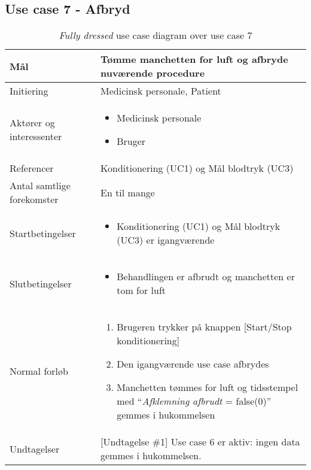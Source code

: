 	\subsection{Use case 7 - Afbryd}
	\begin{table}[H]
			\begin{center}
			\begin{tabular}{ | p{} | p{}| } 
				\hline
				Mål & Tømme manchetten for luft og afbryde nuværende procedure \\ 
				\hline
				Initiering &  Medicinsk personale, Patient\\
				\hline
				Aktører og interessenter & 
				\begin{itemize}
					\item Medicinsk personale 
					\item Bruger 
				\end{itemize} \\ 
				\hline
				Referencer & Konditionering (UC1) og Mål blodtryk (UC3) \\ 
				\hline
				Antal samtlige forekomster & En til mange \\ 
				\hline	
				Startbetingelser & 
				\begin{itemize}
					\item Konditionering (UC1) og Mål blodtryk (UC3) er igangværende 
 				\end{itemize} \\ 
				\hline
				Slutbetingelser & 
				\begin{itemize}
					\item Behandlingen er afbrudt og manchetten er tom for luft
				\end{itemize} \\ 
				\hline
				Normal forløb & \begin{enumerate}
					\setlength\itemsep{0cm} %
					\item Brugeren trykker på knappen [Start/Stop konditionering]
					\item Den igangværende use case afbrydes
					\item Manchetten tømmes for luft og tidsstempel med “\textit{Afklemning afbrudt} = false(0)” gemmes i hukommelsen
					\subitem[Undtagelse \#1]
				\end{enumerate} \\ 
				\hline
				Undtagelser & [Undtagelse \#1] Use case 6 er aktiv: ingen data gemmes i hukommelsen. \\ 
				\hline
			\end{tabular}
		\end{center}
			\caption{\textit{Fully dressed} use case diagram over use case 7}
		\end{table}
	\newpage

		